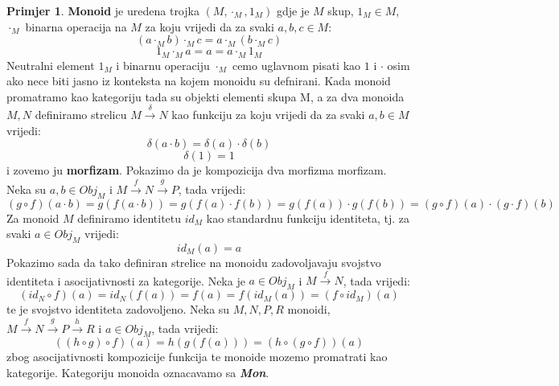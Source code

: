 \documentclass[11pt]{article}
\newcommand{\category}[1]{\textbf{\emph{#1}}}
\theoremstyle{definition}
\newtheorem{primjer}{Primjer}
\begin{document}
  \begin{primjer}
    \textbf{Monoid} je uredena trojka $(M, \cdot_M, 1_M)$ gdje je $M$ skup, $1_M
    \in M$, $\cdot_M$ binarna operacija na $M$ za koju vrijedi da za svaki $a, b, c \in M$:
    \begin{equation*}
      (a \cdot_M b) \cdot_M c = a \cdot_M (b \cdot_M c)
    \end{equation*}
    \begin{equation*}
      1_M \cdot_M a = a = a \cdot_M 1_M
    \end{equation*}
    Neutralni element $1_M$ i binarnu operaciju $\cdot_M$ cemo uglavnom pisati
    kao $1$ i $\cdot$ osim ako nece biti jasno iz konteksta na kojem monoidu
    su defnirani.
    Kada monoid promatramo kao kategoriju tada su objekti elementi skupa M, a
    za dva monoida $M, N$ definiramo strelicu $M \xrightarrow{\delta} N$ kao
    funkciju za koju vrijedi da za svaki $a, b \in M$ vrijedi:
    \begin{equation*}
      \delta(a \cdot b) = \delta(a) \cdot \delta(b)
    \end{equation*}
    \begin{equation*}
      \delta(1) = 1
    \end{equation*}
    i zovemo ju \textbf{morfizam}.
    Pokazimo da je kompozicija dva morfizma morfizam.
    Neka su $a, b \in Obj_M$ i $M \xrightarrow{f} N \xrightarrow{g} P$, tada vrijedi:
    \begin{equation*}
      (g \circ f)(a \cdot b) = g(f(a \cdot b)) = g(f(a) \cdot f(b)) = g(f(a))
      \cdot g(f(b)) = (g \circ f)(a) \cdot (g \cdot f)(b)
    \end{equation*}
    Za monoid $M$ definiramo identitetu $id_M$ kao standardnu funkciju
    identiteta, tj. za svaki $a \in Obj_M$ vrijedi:
    \begin{equation*}
      id_M(a) = a
    \end{equation*}
    Pokazimo sada da tako definiran strelice na monoidu zadovoljavaju
    svojstvo identiteta i asocijativnosti za kategorije.
    Neka je $a \in Obj_M$ i $M \xrightarrow{f} N$, tada vrijedi:
    \begin{equation*}
      (id_N \circ f)(a) = id_N(f(a)) = f(a) = f(id_M(a)) = (f \circ id_M)(a)
    \end{equation*}
    te je svojstvo identiteta zadovoljeno.
    Neka su $M, N, P, R$ monoidi, $M \xrightarrow{f} N \xrightarrow{g} P \xrightarrow{h} R$
    i $a \in Obj_M$, tada vrijedi:
    \begin{equation*}
      ((h \circ g) \circ f)(a) = h(g(f(a))) = (h \circ (g \circ f))(a)
    \end{equation*}
    zbog asocijativnosti kompozicije funkcija te monoide mozemo promatrati kao
    kategorije. Kategoriju monoida oznacavamo sa \category{Mon}.
  \end{primjer}
\end{document}
